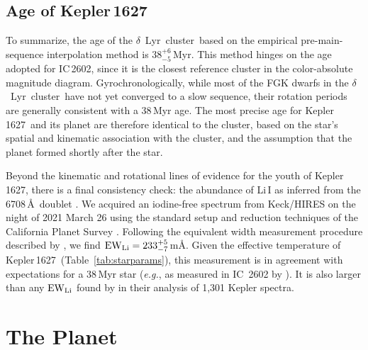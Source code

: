 \documentclass[12pt,modern,twocolumn,tighten]{aastex63}
\newcommand{\cn}{$\delta$\ Lyr\ cluster} %
\newcommand{\sn}{Kepler\,1627} %
\newcommand{\clusterage}{$38^{+6}_{-5}$\,Myr} %
\begin{document}
\subsection{Age of Kepler\,1627}

To summarize, the age of the \cn\ based on the empirical
pre-main-sequence interpolation method is \clusterage.  This method
hinges on the age adopted for IC\,2602, since it is the closest
reference cluster in the color-absolute magnitude diagram.
Gyrochronologically, while most of the FGK dwarfs in the \cn\ have not
yet converged to a slow sequence, their rotation periods are generally
consistent with a 38\,Myr age. The most precise age for \sn\ and its
planet are therefore identical to the cluster, based on the star's
spatial and kinematic association with the cluster, and the assumption
that the planet formed shortly after the star.

Beyond the kinematic and rotational lines of evidence for the youth of
\sn, there is a final consistency check: the abundance of
Li\,\textsc{I} as inferred from the 6708\,\AA\ doublet \citep[{\it
e.g.},][]{soderblom_ages_2014}.  We acquired an iodine-free spectrum
from Keck/HIRES on the night of 2021 March 26 using the standard setup
and reduction techniques of the California Planet Survey
\citep{howard_cps_2010}.  Following the equivalent width measurement
procedure described by \citet{bouma_2021_ngc2516}, we find ${\rm
EW}_{\rm Li} = 233^{+5}_{-7}$\,m\AA.   %
Given the effective temperature of \sn\ (Table~\ref{tab:starparams}),
this measurement is in agreement with expectations for a 38\,Myr star
({\it e.g.}, as measured in IC~2602 by
\citealt{randich_gaiaeso_2018}).  It is also larger than any ${\rm
EW}_{\rm Li}$ found by \citet{berger_identifying_2018} in their
analysis of 1{,}301 Kepler spectra.


\section{The Planet}
\label{sec:planet}
\end{document}
